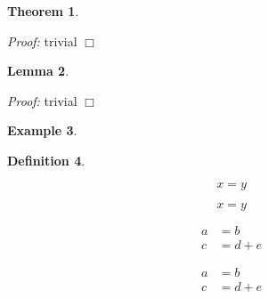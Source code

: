 \documentclass[a4paper,11pt,notitlepage,fullpage]{paper}
\theoremstyle{plain}
\newtheorem{thm}{Theorem}[section] %
\newtheorem{lem}[thm]{Lemma}
\theoremstyle{definition}
\newtheorem{defn}[thm]{Definition} %
\newtheorem{exmp}[thm]{Example} %
\begin{document}

\begin{thm}

\end{thm}
\emph{Proof:} trivial \hfill $\Box$

\begin{lem}

\end{lem}
\emph{Proof:} trivial \hfill $\Box$


\begin{exmp}

\end{exmp}


\begin{defn}

\end{defn}



\begin{equation}
x = y
\end{equation}


\begin{equation*}
x = y
\end{equation*}


\begin{align}
a &= b \\
c &= d + e
\end{align}


\begin{align*}
a &= b \\
c &= d + e
\end{align*}





%
%
\end{document}
